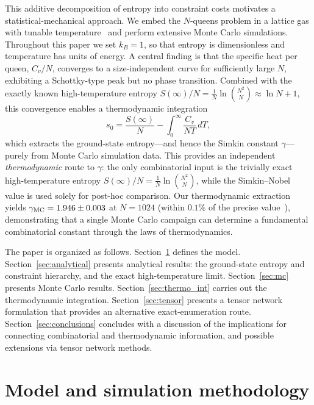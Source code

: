 \documentclass[aps, pre, reprint, amsmath, amssymb, superscriptaddress, floatfix]{revtex4-2}
\begin{document}
This additive decomposition of entropy into constraint costs motivates
a statistical-mechanical approach.  We embed the $N$-queens
problem in a lattice gas with tunable
temperature~\cite{Zhang2009,Polson2024} and perform extensive Monte
Carlo simulations.  Throughout this paper we set $k_B = 1$, so that
entropy is dimensionless and temperature has units of energy.
A central finding is that the specific heat per
queen, $C_v/N$, converges to a size-independent curve for
sufficiently large $N$, exhibiting a Schottky-type peak but no phase
transition.  Combined with the exactly known high-temperature entropy
$S(\infty)/N = \frac{1}{N}\ln\binom{N^2}{N} \approx \ln N + 1$,
this convergence enables a thermodynamic integration
\begin{equation*}
  s_0 = \frac{S(\infty)}{N} - \int_0^\infty \frac{C_v}{NT}\,dT,
\end{equation*}
which extracts the ground-state entropy---and hence the Simkin
constant $\gamma$---purely from Monte Carlo simulation data.
This provides an independent \emph{thermodynamic} route to $\gamma$:
the only combinatorial input is the trivially exact high-temperature
entropy $S(\infty)/N = \frac{1}{N}\ln\binom{N^2}{N}$, while the
Simkin--Nobel value is used solely for post-hoc comparison.
Our thermodynamic extraction yields $\gamma_{\rm MC} = 1.946 \pm 0.003$ at
$N = 1024$ (within $0.1\%$ of the precise value~\cite{Nobel2023}), demonstrating
that a single Monte Carlo campaign can determine a fundamental
combinatorial constant through the laws of thermodynamics.

The paper is organized as follows.
Section~\ref{sec:model} defines the model.
Section~\ref{sec:analytical} presents analytical results: the
ground-state entropy and constraint hierarchy, and the exact
high-temperature limit.
Section~\ref{sec:mc} presents Monte Carlo results.
Section~\ref{sec:thermo_int} carries out the thermodynamic integration.
Section~\ref{sec:tensor} presents a tensor network formulation that
provides an alternative exact-enumeration route.
Section~\ref{sec:conclusions} concludes with a discussion of the implications for connecting combinatorial and thermodynamic information, and possible extensions via tensor network methods.


\section{Model and simulation methodology}
\label{sec:model}
\end{document}
